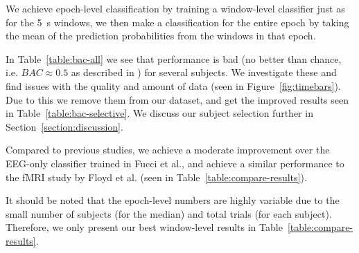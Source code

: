         We achieve epoch-level classification by training a window-level classifier just as for the \SI{5}{\second} windows, we then make a classification for the entire epoch by taking the mean of the prediction probabilities from the windows in that epoch.

        

        In Table~\ref{table:bac-all} we see that performance is bad (no better than chance, i.e. $BAC \approx 0.5$ as described in ) for several subjects. We investigate these and find issues with the quality and amount of data (seen in Figure~\ref{fig:timebars}). Due to this we remove them from our dataset, and get the improved results seen in Table~\ref{table:bac-selective}. We discuss our subject selection further in Section~\ref{section:discussion}.

        Compared to previous studies, we achieve a moderate improvement over the EEG-only classifier trained in Fucci et al., and achieve a similar performance to the fMRI study by Floyd et al. (seen in Table~\ref{table:compare-results}).

        

        It should be noted that the epoch-level numbers are highly variable due to the small number of subjects (for the median) and total trials (for each subject). Therefore, we only present our best window-level results in Table~\ref{table:compare-results}.

        

